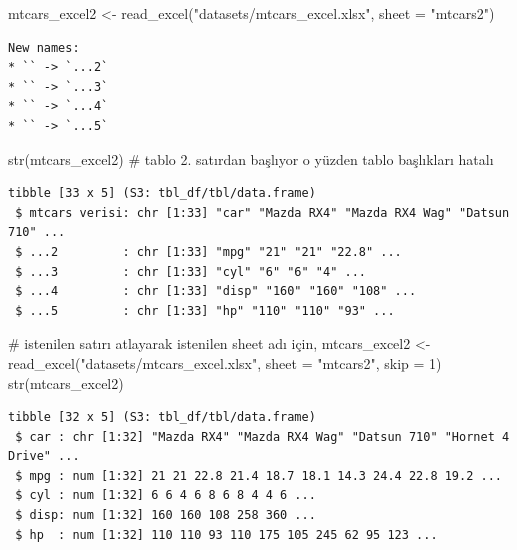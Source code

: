 \documentclass[
  letterpaper,
  DIV=11,
  numbers=noendperiod]{scrreprt}
\newenvironment{Shaded}{\begin{snugshade}}{\end{snugshade}}
\newcommand{\AttributeTok}[1]{\textcolor[rgb]{0.40,0.45,0.13}{#1}}
\newcommand{\CommentTok}[1]{\textcolor[rgb]{0.37,0.37,0.37}{#1}}
\newcommand{\DecValTok}[1]{\textcolor[rgb]{0.68,0.00,0.00}{#1}}
\newcommand{\FunctionTok}[1]{\textcolor[rgb]{0.28,0.35,0.67}{#1}}
\newcommand{\NormalTok}[1]{\textcolor[rgb]{0.00,0.23,0.31}{#1}}
\newcommand{\OtherTok}[1]{\textcolor[rgb]{0.00,0.23,0.31}{#1}}
\newcommand{\StringTok}[1]{\textcolor[rgb]{0.13,0.47,0.30}{#1}}
\begin{document}
\begin{Shaded}
\begin{Highlighting}[]
\NormalTok{mtcars\_excel2 }\OtherTok{\textless{}{-}} \FunctionTok{read\_excel}\NormalTok{(}\StringTok{"datasets/mtcars\_excel.xlsx"}\NormalTok{,}
                            \AttributeTok{sheet =} \StringTok{"mtcars2"}\NormalTok{)}
\end{Highlighting}
\end{Shaded}

\begin{verbatim}
New names:
* `` -> `...2`
* `` -> `...3`
* `` -> `...4`
* `` -> `...5`
\end{verbatim}

\begin{Shaded}
\begin{Highlighting}[]
\FunctionTok{str}\NormalTok{(mtcars\_excel2) }\CommentTok{\# tablo 2. satırdan başlıyor o yüzden tablo başlıkları hatalı}
\end{Highlighting}
\end{Shaded}

\begin{verbatim}
tibble [33 x 5] (S3: tbl_df/tbl/data.frame)
 $ mtcars verisi: chr [1:33] "car" "Mazda RX4" "Mazda RX4 Wag" "Datsun 710" ...
 $ ...2         : chr [1:33] "mpg" "21" "21" "22.8" ...
 $ ...3         : chr [1:33] "cyl" "6" "6" "4" ...
 $ ...4         : chr [1:33] "disp" "160" "160" "108" ...
 $ ...5         : chr [1:33] "hp" "110" "110" "93" ...
\end{verbatim}

\begin{Shaded}
\begin{Highlighting}[]
\CommentTok{\# istenilen satırı atlayarak istenilen sheet adı için,}
\NormalTok{mtcars\_excel2 }\OtherTok{\textless{}{-}} \FunctionTok{read\_excel}\NormalTok{(}\StringTok{"datasets/mtcars\_excel.xlsx"}\NormalTok{,}
                            \AttributeTok{sheet =} \StringTok{"mtcars2"}\NormalTok{,}
                            \AttributeTok{skip =} \DecValTok{1}\NormalTok{)}
\FunctionTok{str}\NormalTok{(mtcars\_excel2)}
\end{Highlighting}
\end{Shaded}

\begin{verbatim}
tibble [32 x 5] (S3: tbl_df/tbl/data.frame)
 $ car : chr [1:32] "Mazda RX4" "Mazda RX4 Wag" "Datsun 710" "Hornet 4 Drive" ...
 $ mpg : num [1:32] 21 21 22.8 21.4 18.7 18.1 14.3 24.4 22.8 19.2 ...
 $ cyl : num [1:32] 6 6 4 6 8 6 8 4 4 6 ...
 $ disp: num [1:32] 160 160 108 258 360 ...
 $ hp  : num [1:32] 110 110 93 110 175 105 245 62 95 123 ...
\end{verbatim}
\end{document}
